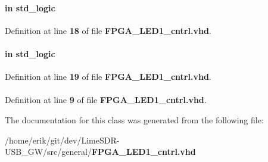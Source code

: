 \paragraph[{pll1\+\_\+locked}]{ {\bfseries \textcolor{keywordflow}{in}\textcolor{vhdlchar}{ }} {\bfseries \textcolor{comment}{std\+\_\+logic}\textcolor{vhdlchar}{ }} \hspace{0.3cm}{\ttfamily [Port]}}\label{classFPGA__LED1__cntrl_a4142c7790600038f799cc128469786d8}


Definition at line {\bf 18} of file {\bf F\+P\+G\+A\+\_\+\+L\+E\+D1\+\_\+cntrl.\+vhd}.

\paragraph[{pll2\+\_\+locked}]{ {\bfseries \textcolor{keywordflow}{in}\textcolor{vhdlchar}{ }} {\bfseries \textcolor{comment}{std\+\_\+logic}\textcolor{vhdlchar}{ }} \hspace{0.3cm}{\ttfamily [Port]}}\label{classFPGA__LED1__cntrl_a4fa3184ec04a5923723b3e4168ac57a6}


Definition at line {\bf 19} of file {\bf F\+P\+G\+A\+\_\+\+L\+E\+D1\+\_\+cntrl.\+vhd}.

\paragraph[{std\+\_\+logic\+\_\+1164}]{\hspace{0.3cm}{\ttfamily [Package]}}\label{classFPGA__LED1__cntrl_acd03516902501cd1c7296a98e22c6fcb}


Definition at line {\bf 9} of file {\bf F\+P\+G\+A\+\_\+\+L\+E\+D1\+\_\+cntrl.\+vhd}.



The documentation for this class was generated from the following file\+:\begin{DoxyCompactItemize}
\item 
/home/erik/git/dev/\+Lime\+S\+D\+R-\/\+U\+S\+B\+\_\+\+G\+W/src/general/{\bf F\+P\+G\+A\+\_\+\+L\+E\+D1\+\_\+cntrl.\+vhd}\end{DoxyCompactItemize}
